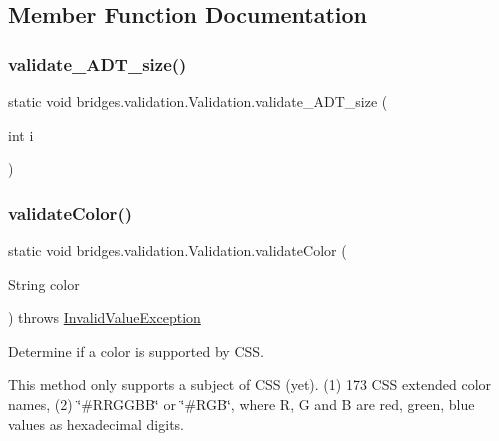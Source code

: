 \subsection{Member Function Documentation}
\mbox{\label{classbridges_1_1validation_1_1_validation_a0a3b322af9a6815fd1acba481858d0e3}} 
\subsubsection{\texorpdfstring{validate\_ADT\_size()}{validate\_ADT\_size()}}
{\footnotesize\ttfamily static void bridges.\+validation.\+Validation.\+validate\+\_\+\+A\+D\+T\+\_\+size (\begin{DoxyParamCaption}\item[{int}]{i }\end{DoxyParamCaption})\hspace{0.3cm}{\ttfamily [static]}}

\mbox{\label{classbridges_1_1validation_1_1_validation_ae529d673f5b86b457ed7b7d4d80a9dbf}} 
\subsubsection{\texorpdfstring{validateColor()}{validateColor()}}
{\footnotesize\ttfamily static void bridges.\+validation.\+Validation.\+validate\+Color (\begin{DoxyParamCaption}\item[{String}]{color }\end{DoxyParamCaption}) throws \mbox{\hyperlink{classbridges_1_1validation_1_1_invalid_value_exception}{Invalid\+Value\+Exception}}\hspace{0.3cm}{\ttfamily [static]}}

Determine if a color is supported by C\+SS.

This method only supports a subject of C\+SS (yet). (1) 173 C\+SS extended color names, (2) \char`\"{}\#\+R\+R\+G\+G\+B\+B\char`\"{} or \char`\"{}\#\+R\+G\+B\char`\"{}, where R, G and B are red, green, blue values as hexadecimal digits.

